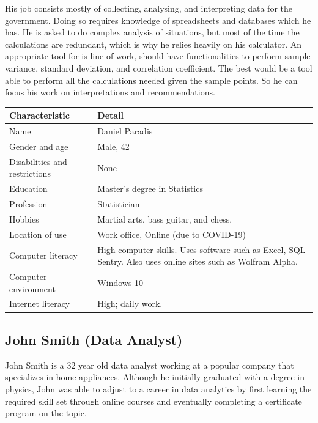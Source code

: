 \documentclass[11pt,onside]{report}
\begin{document}
His job consists mostly of collecting, analysing, and interpreting data for the government. Doing so requires knowledge of spreadsheets and databases which he has. He is asked to do complex analysis of situations, but most of the time the calculations are redundant, which is why he relies heavily on his calculator. An appropriate tool for is line of work, should have functionalities to perform sample variance, standard deviation, and correlation coefficient. The best would be a tool able to perform all the calculations needed given the sample points. So he can focus his work on interpretations and recommendations.
\begin{center}
    \begin{tabular}{|p{4cm}|p{10cm}|}
        \hline
        \bf{Characteristic} & \bf{Detail} \\
        \hline
        Name &   Daniel Paradis \\
        \hline
        Gender and age & Male, 42 \\
        \hline
        Disabilities and restrictions & None \\
        \hline
        Education & Master's degree in Statistics \\
        \hline
        Profession & Statistician \\
        \hline
        Hobbies & Martial arts, bass guitar, and chess. \\
        \hline
        Location of use & Work office, Online (due to COVID-19) \\
        \hline
        Computer literacy & High computer skills. Uses software such as Excel, SQL Sentry. Also uses online sites such as Wolfram Alpha. \\
        \hline
        Computer environment &  Windows 10 \\
        \hline
        Internet literacy &  High; daily work. \\
        \hline
    \end{tabular}
\end{center}

\subsection{John Smith (Data Analyst)}
John Smith is a 32 year old data analyst working at a popular company that specializes in home appliances. Although he initially graduated with a degree in physics, John was able to adjust to a career in data analytics by first learning the required skill set through online courses and eventually completing a certificate program on the topic. \\
\end{document}
